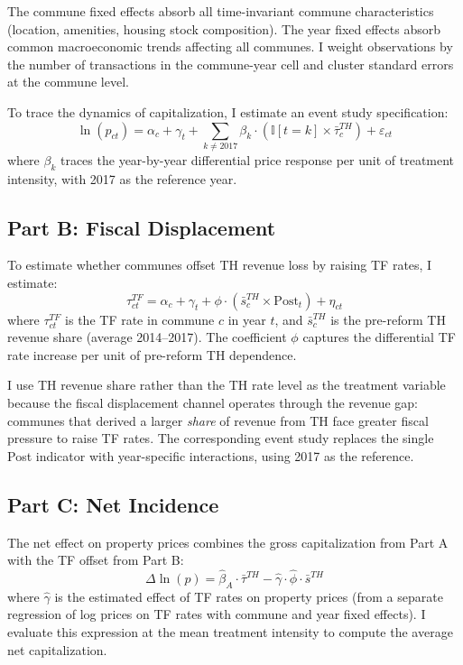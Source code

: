 \documentclass[12pt]{article}
\newcommand{\ind}{\mathbb{I}}
\begin{document}
The commune fixed effects absorb all time-invariant commune characteristics (location, amenities, housing stock composition). The year fixed effects absorb common macroeconomic trends affecting all communes. I weight observations by the number of transactions in the commune-year cell and cluster standard errors at the commune level.

To trace the dynamics of capitalization, I estimate an event study specification:
\begin{equation}
\ln(p_{ct}) = \alpha_c + \gamma_t + \sum_{k \neq 2017} \beta_k \cdot (\ind[t = k] \times \bar\tau^{TH}_c) + \varepsilon_{ct}
\label{eq:eventstudy}
\end{equation}
where $\beta_k$ traces the year-by-year differential price response per unit of treatment intensity, with 2017 as the reference year.

\subsection{Part B: Fiscal Displacement}

To estimate whether communes offset TH revenue loss by raising TF rates, I estimate:
\begin{equation}
\tau^{TF}_{ct} = \alpha_c + \gamma_t + \phi \cdot (\bar{s}^{TH}_c \times \text{Post}_t) + \eta_{ct}
\label{eq:partB}
\end{equation}
where $\tau^{TF}_{ct}$ is the TF rate in commune $c$ in year $t$, and $\bar{s}^{TH}_c$ is the pre-reform TH revenue share (average 2014--2017). The coefficient $\phi$ captures the differential TF rate increase per unit of pre-reform TH dependence.

I use TH revenue share rather than the TH rate level as the treatment variable because the fiscal displacement channel operates through the revenue gap: communes that derived a larger \emph{share} of revenue from TH face greater fiscal pressure to raise TF rates. The corresponding event study replaces the single Post indicator with year-specific interactions, using 2017 as the reference.

\subsection{Part C: Net Incidence}

The net effect on property prices combines the gross capitalization from Part A with the TF offset from Part B:
\begin{equation}
\Delta \ln(p) = \hat\beta_A \cdot \bar\tau^{TH} - \hat\gamma \cdot \hat\phi \cdot \bar{s}^{TH}
\end{equation}
where $\hat\gamma$ is the estimated effect of TF rates on property prices (from a separate regression of log prices on TF rates with commune and year fixed effects). I evaluate this expression at the mean treatment intensity to compute the average net capitalization.
\end{document}
